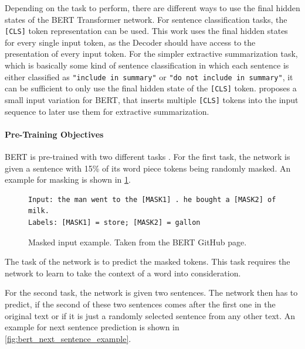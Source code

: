Depending on the task to perform, there are different ways to use the final hidden states of the BERT Transformer network.
For sentence classification tasks, the \texttt{[CLS]} token representation can be used.
This work uses the final hidden states for every single input token, as the Decoder should have access to the presentation of every input token.
For the simpler extractive summarization task, which is basically some kind of sentence classification in which each sentence is either classified as \texttt{"include in summary"} or \texttt{"do not include in summary"}, it can be sufficient to only use the final hidden state of the \texttt{[CLS]} token. 
\cite{1903.10318} proposes a small input variation for BERT, that inserts multiple \texttt{[CLS]} tokens into the input sequence to later use them for extractive summarization.

\paragraph{Pre-Training Objectives}

BERT is pre-trained with two different tasks \cite[p.~4--5]{devlin2018bert}.
For the first task, the network is given a sentence with 15\% of its word piece tokens being randomly masked.
An example for masking is shown in \cref{fig:bert_masking_example}.

\begin{figure}[h]
\begin{lstlisting}[numbers=none]
Input: the man went to the [MASK1] . he bought a [MASK2] of milk.
Labels: [MASK1] = store; [MASK2] = gallon
\end{lstlisting}
\caption[Masked input example]{Masked input example. Taken from the BERT GitHub page.}
\label{fig:bert_masking_example}
\end{figure}

The task of the network is to predict the masked tokens.
This task requires the network to learn to take the context of a word into consideration.

For the second task, the network is given two sentences.
The network then has to predict, if the second of these two sentences comes after the first one in the original text or if it is just a randomly selected sentence from any other text.
An example for next sentence prediction is shown in \cref{fig:bert_next_sentence_example}.

